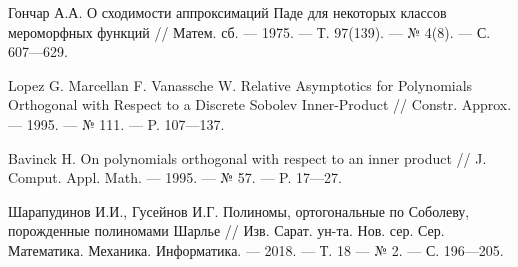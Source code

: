 \begin{thebibliography}{20}
Гончар А.А. О сходимости аппроксимаций Паде для некоторых классов мероморфных функций // Матем. сб. --- 1975. --- Т. 97(139). --- № 4(8). --- С. 607---629.



Lopez G. Marcellan F. Vanassche W. Relative Asymptotics for Polynomials Orthogonal with Respect to a Discrete Sobolev Inner-Product // Constr. Approx. --- 1995. --- № 111. --- P. 107---137.



Bavinck H. On polynomials orthogonal with respect to an inner product // J. Comput. Appl. Math. --- 1995. --- № 57. --- P. 17---27.



Шарапудинов И.И., Гусейнов И.Г. Полиномы, ортогональные по Соболеву, порожденные полиномами Шарлье // Изв. Сарат. ун-та. Нов. сер. Сер. Математика. Механика. Информатика. --- 2018. --- Т. 18 --- № 2. --- С. 196---205.


\end{thebibliography}
